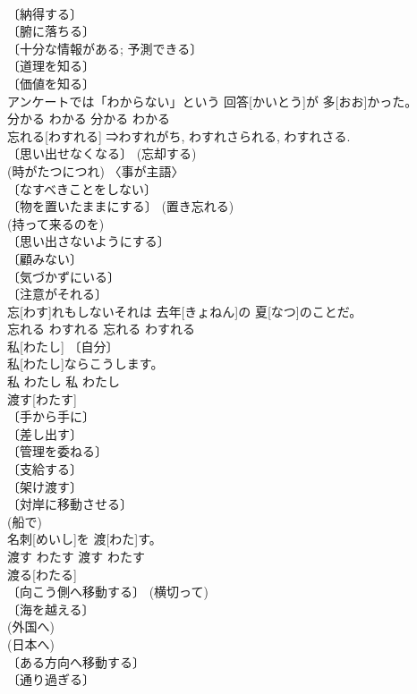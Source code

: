 \documentclass[8pt]{extreport}
\begin{document}
\begin{CJK}{UTF8}{min}
\\	〔納得する〕 
\\	〔腑に落ちる〕 
\\	〔十分な情報がある; 予測できる〕 
\\	〔道理を知る〕 
\\	〔価値を知る〕 
\\	アンケートでは「わからない」という 回答[かいとう]が 多[おお]かった。	
\\	分かる	わかる	分かる	わかる	
\\	忘れる[わすれる]	⇒わすれがち, わすれさられる, わすれさる. 
\\	〔思い出せなくなる〕 (忘却する) 
\\	(時がたつにつれ) 〈事が主語〉 
\\	〔なすべきことをしない〕 
\\	〔物を置いたままにする〕 (置き忘れる) 
\\	(持って来るのを) 
\\	〔思い出さないようにする〕 
\\	〔顧みない〕 
\\	〔気づかずにいる〕 
\\	〔注意がそれる〕 
\\	忘[わす]れもしないそれは 去年[きょねん]の 夏[なつ]のことだ。	
\\	忘れる	わすれる	忘れる	わすれる	
\\	私[わたし]	〔自分〕 
\\	[⇒わたしたち]	私[わたし]ならこうします。	
\\	私	わたし	私	わたし	
\\	渡す[わたす]	
\\	〔手から手に〕 
\\	〔差し出す〕 
\\	〔管理を委ねる〕 
\\	〔支給する〕 
\\	〔架け渡す〕 
\\	〔対岸に移動させる〕 
\\	(船で) 
\\	名刺[めいし]を 渡[わた]す。	
\\	渡す	わたす	渡す	わたす	
\\	渡る[わたる]	
\\	〔向こう側へ移動する〕 (横切って) 
\\	〔海を越える〕 
\\	(外国へ) 
\\	(日本へ) 
\\	〔ある方向へ移動する〕 
\\	〔通り過ぎる〕 

\end{CJK}
\end{document}
